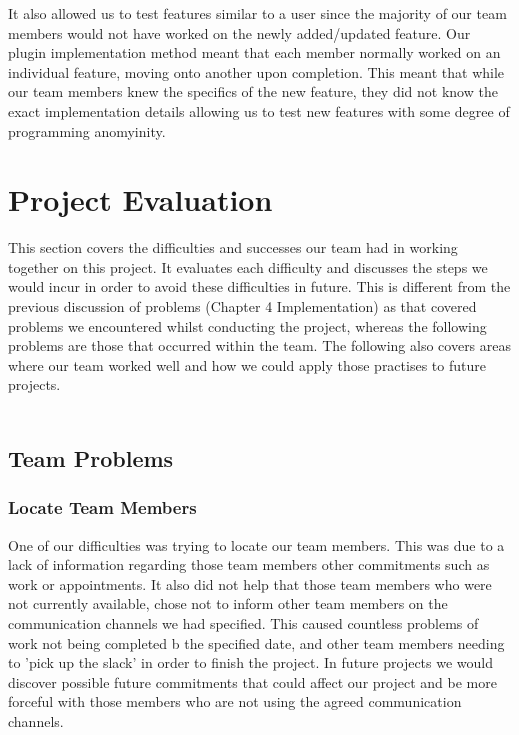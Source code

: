 \documentclass{l3proj}
\begin{document}
It also allowed us to test features similar to a user since the majority of our team members would not have worked on the newly added/updated feature. Our plugin implementation method meant that each member normally worked on an individual feature, moving onto another upon completion. This meant that while our team members knew the specifics of the new feature, they did not know the exact implementation details allowing us to test new features with some degree of programming anomyinity. 
\section{Project Evaluation}
This section covers the difficulties and successes our team had in working together on this project. It evaluates each difficulty and discusses the steps we would incur in order to avoid these difficulties in future. This is different from the previous discussion of problems (Chapter 4 Implementation) as that covered problems we encountered whilst conducting the project, whereas the following problems are those that occurred within the team. The following also covers areas where our team worked well and how we could apply those practises to future projects.  \\
\\
\subsection{Team Problems}

\subsubsection{Locate Team Members}
One of our difficulties was trying to locate our team members. This was due to a lack of information regarding those team members other commitments such as work or appointments. It also did not help that those team members who were not currently available, chose not to inform other team members on the communication channels we had specified. This caused countless problems of work not being completed b the specified date, and other team members needing to 'pick up the slack' in order to finish the project. In future projects we would discover possible future commitments that could affect our project and be more forceful with those members who are not using the agreed communication channels.\\
\\
\end{document}
